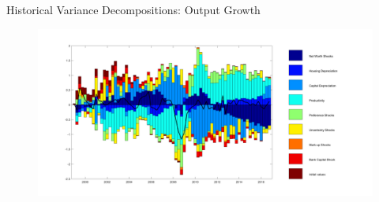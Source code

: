 \documentclass[8pt,aspectratio=169]{beamer}
\numberwithin{equation}{section}
\begin{document}







\begin{frame}{Historical Variance Decompositions: Output   Growth }



\begin{figure}
\includegraphics[scale=0.36]{decomp_dy.pdf}
\end{figure}


\end{frame}
\end{document}
